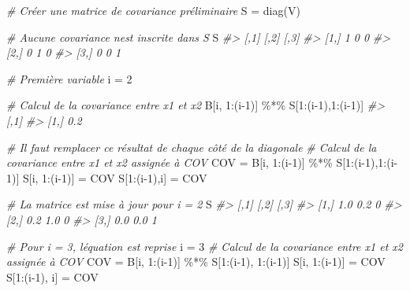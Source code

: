 \documentclass[
]{book}
\newenvironment{Shaded}{}{}
\newcommand{\CommentTok}[1]{\textit{#1}}
\newcommand{\DecValTok}[1]{#1}
\newcommand{\FunctionTok}[1]{#1}
\newcommand{\NormalTok}[1]{#1}
\newcommand{\OtherTok}[1]{#1}
\newcommand{\SpecialCharTok}[1]{#1}
\begin{document}
\begin{Shaded}
\begin{Highlighting}[]
\CommentTok{\# Créer une matrice de covariance préliminaire}
\NormalTok{S }\OtherTok{=} \FunctionTok{diag}\NormalTok{(V)}

\CommentTok{\# Aucune covariance n\textquotesingle{}est inscrite dans S}
\NormalTok{S}
\CommentTok{\#\textgreater{}      [,1] [,2] [,3]}
\CommentTok{\#\textgreater{} [1,]    1    0    0}
\CommentTok{\#\textgreater{} [2,]    0    1    0}
\CommentTok{\#\textgreater{} [3,]    0    0    1}

\CommentTok{\# Première variable}
\NormalTok{i }\OtherTok{=} \DecValTok{2}

\CommentTok{\# Calcul de la covariance entre x1 et x2}
\NormalTok{B[i, }\DecValTok{1}\SpecialCharTok{:}\NormalTok{(i}\DecValTok{{-}1}\NormalTok{)] }\SpecialCharTok{\%*\%}\NormalTok{ S[}\DecValTok{1}\SpecialCharTok{:}\NormalTok{(i}\DecValTok{{-}1}\NormalTok{),}\DecValTok{1}\SpecialCharTok{:}\NormalTok{(i}\DecValTok{{-}1}\NormalTok{)]}
\CommentTok{\#\textgreater{}      [,1]}
\CommentTok{\#\textgreater{} [1,]  0.2}

\CommentTok{\# Il faut remplacer ce résultat de chaque côté de la diagonale}
\CommentTok{\# Calcul de la covariance entre x1 et x2 assignée à COV}
\NormalTok{COV }\OtherTok{=}\NormalTok{ B[i, }\DecValTok{1}\SpecialCharTok{:}\NormalTok{(i}\DecValTok{{-}1}\NormalTok{)] }\SpecialCharTok{\%*\%}\NormalTok{ S[}\DecValTok{1}\SpecialCharTok{:}\NormalTok{(i}\DecValTok{{-}1}\NormalTok{),}\DecValTok{1}\SpecialCharTok{:}\NormalTok{(i}\DecValTok{{-}1}\NormalTok{)]}
\NormalTok{S[i, }\DecValTok{1}\SpecialCharTok{:}\NormalTok{(i}\DecValTok{{-}1}\NormalTok{)] }\OtherTok{=}\NormalTok{ COV}
\NormalTok{S[}\DecValTok{1}\SpecialCharTok{:}\NormalTok{(i}\DecValTok{{-}1}\NormalTok{),i] }\OtherTok{=}\NormalTok{ COV}

\CommentTok{\# La matrice est mise à jour pour i = 2}
\NormalTok{S}
\CommentTok{\#\textgreater{}      [,1] [,2] [,3]}
\CommentTok{\#\textgreater{} [1,]  1.0  0.2    0}
\CommentTok{\#\textgreater{} [2,]  0.2  1.0    0}
\CommentTok{\#\textgreater{} [3,]  0.0  0.0    1}

\CommentTok{\# Pour i = 3, l\textquotesingle{}équation est reprise}
\NormalTok{i }\OtherTok{=} \DecValTok{3}
\CommentTok{\# Calcul de la covariance entre x1 et x2 assignée à COV}
\NormalTok{COV }\OtherTok{=}\NormalTok{ B[i, }\DecValTok{1}\SpecialCharTok{:}\NormalTok{(i}\DecValTok{{-}1}\NormalTok{)] }\SpecialCharTok{\%*\%}\NormalTok{ S[}\DecValTok{1}\SpecialCharTok{:}\NormalTok{(i}\DecValTok{{-}1}\NormalTok{), }\DecValTok{1}\SpecialCharTok{:}\NormalTok{(i}\DecValTok{{-}1}\NormalTok{)]}
\NormalTok{S[i, }\DecValTok{1}\SpecialCharTok{:}\NormalTok{(i}\DecValTok{{-}1}\NormalTok{)] }\OtherTok{=}\NormalTok{ COV}
\NormalTok{S[}\DecValTok{1}\SpecialCharTok{:}\NormalTok{(i}\DecValTok{{-}1}\NormalTok{), i] }\OtherTok{=}\NormalTok{ COV}


\end{Highlighting}
\end{Shaded}
\end{document}
